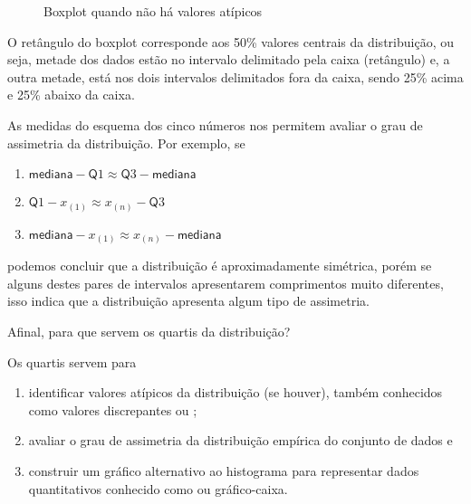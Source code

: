 \begin{figure}[H]
\centering
\capstart

\noindent{}
\caption{Boxplot quando não há valores atípicos}\label{\detokenize{PE104-6:fig-boxplotsemvaloratipico}}\label{\detokenize{PE104-6:id7}}\end{figure}

O retângulo do boxplot corresponde aos 50\% valores centrais da distribuição, ou seja, metade dos dados estão no intervalo delimitado pela  caixa (retângulo) e, a outra metade, está nos dois intervalos delimitados fora da caixa, sendo 25\% acima e 25\% abaixo da caixa.

As medidas do esquema dos cinco números nos permitem avaliar o grau de assimetria da distribuição. Por exemplo, se
\begin{enumerate}
\item {} 
\(\textsf{mediana} -\textsf{Q}1\approx \textsf{Q}3-\textsf{mediana}\)

\item {} 
\(\textsf{Q}1-x_{(1)} \approx x_{(n)}-\textsf{Q}3\)

\item {} 
\(\textsf{mediana}-x_{(1)}\approx x_{(n)}-\textsf{mediana}\)

\end{enumerate}

podemos concluir que a distribuição é aproximadamente simétrica, porém se alguns destes pares de intervalos apresentarem comprimentos muito diferentes, isso indica que a distribuição apresenta algum tipo de assimetria.

Afinal, para que servem os quartis da distribuição?

Os quartis servem para
\begin{enumerate}
\item {} 
identificar valores atípicos da distribuição (se houver), também conhecidos como  valores discrepantes ou ;

\item {} 
avaliar o grau de assimetria da distribuição empírica do conjunto de dados e

\item {} 
construir um gráfico alternativo ao histograma para representar dados quantitativos conhecido como  ou gráfico-caixa.

\end{enumerate}

